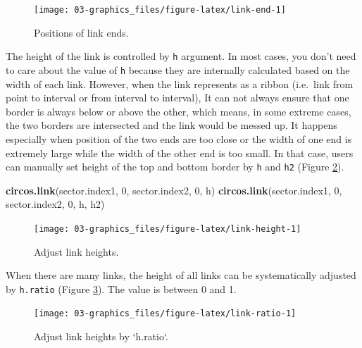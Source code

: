 \documentclass[]{book}
\newenvironment{Shaded}{\begin{snugshade}}{\end{snugshade}}
\newcommand{\KeywordTok}[1]{\textcolor[rgb]{0.13,0.29,0.53}{\textbf{#1}}}
\newcommand{\DecValTok}[1]{\textcolor[rgb]{0.00,0.00,0.81}{#1}}
\newcommand{\NormalTok}[1]{#1}
\begin{document}
\begin{figure}

{\centering \texttt{[image: 03-graphics\_files/figure-latex/link-end-1]} 

}

\caption{Positions of link ends.}\label{fig:link-end}
\end{figure}

The height of the link is controlled by \texttt{h} argument. In most
cases, you don't need to care about the value of \texttt{h} because they
are internally calculated based on the width of each link. However, when
the link represents as a ribbon (i.e.~link from point to interval or
from interval to interval), It can not always ensure that one border is
always below or above the other, which means, in some extreme cases, the
two borders are intersected and the link would be messed up. It happens
especially when position of the two ends are too close or the width of
one end is extremely large while the width of the other end is too
small. In that case, users can manually set height of the top and bottom
border by \texttt{h} and \texttt{h2} (Figure \ref{fig:link-height}).

\begin{Shaded}
\begin{Highlighting}[]
\KeywordTok{circos.link}\NormalTok{(sector.index1, }\DecValTok{0}\NormalTok{, sector.index2, }\DecValTok{0}\NormalTok{, h)}
\KeywordTok{circos.link}\NormalTok{(sector.index1, }\DecValTok{0}\NormalTok{, sector.index2, }\DecValTok{0}\NormalTok{, h, h2)}
\end{Highlighting}
\end{Shaded}

\begin{figure}

{\centering \texttt{[image: 03-graphics\_files/figure-latex/link-height-1]} 

}

\caption{Adjust link heights.}\label{fig:link-height}
\end{figure}

When there are many links, the height of all links can be systematically
adjusted by \texttt{h.ratio} (Figure \ref{fig:link-ratio}). The value is
between 0 and 1.

\begin{figure}

{\centering \texttt{[image: 03-graphics\_files/figure-latex/link-ratio-1]} 

}

\caption{Adjust link heights by `h.ratio`.}\label{fig:link-ratio}
\end{figure}
\end{document}
